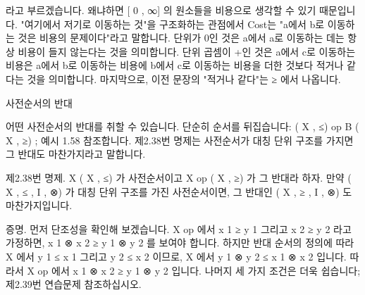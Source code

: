 \documentclass[11pt, a4paper, twoside, openany]{book}
\begin{document}
{\par\medskip
라고 부르겠습니다.  왜냐하면 [ 0 , ∞] 의 원소들을 비용으로 생각할 수 있기 때문입니다. "여기에서 저기로 이동하는 것"을 구조화하는 관점에서 Cost\hspace{0pt}는 "a\hspace{0pt}에서 b\hspace{0pt}로 이동하는 것은 비용의 문제이다"라고 말합니다. 단위가 0\hspace{0pt}인 것은 a\hspace{0pt}에서 a\hspace{0pt}로 이동하는 데는 항상 비용이 들지 않는다는 것을 의미합니다. 단위 곱셈이 +인 것은 a\hspace{0pt}에서 c\hspace{0pt}로 이동하는 비용은 a\hspace{0pt}에서 b\hspace{0pt}로 이동하는 비용에 b\hspace{0pt}에서 c\hspace{0pt}로 이동하는 비용을 더한 것보다 적거나 같다는 것을 의미합니다. 마지막으로, 이전 문장의 "적거나 같다"는 ≥ 에서 나옵니다.

\par\medskip
사전순서의 반대

\par\medskip
어떤 사전순서의 반대를 취할 수 있습니다. 단순히 순서를 뒤집습니다: ( X , ≤) op B ( X , ≥) ; 예시 1.58 참조합니다.  제\hspace{0pt}2.38\hspace{0pt}번 명제는 사전순서가 대칭 단위 구조를 가지면 그 반대도 마찬가지라고 말합니다.

\par\medskip
제\hspace{0pt}2.38\hspace{0pt}번 명제. X  ( X , ≤) 가 사전순서이고 X op  ( X , ≥) 가 그 반대라 하자. 만약 ( X , ≤ , I , ⊗) 가 대칭 단위 구조를 가진 사전순서이면, 그 반대인 ( X , ≥ , I , ⊗) 도 마찬가지입니다.

\par\medskip
증명. 먼저 단조성을 확인해 보겠습니다.  X op 에서 x 1 ≥ y 1 그리고 x 2 ≥ y 2 라고 가정하면, x 1 ⊗ x 2 ≥ y 1 ⊗ y 2 를 보여야 합니다. 하지만 반대 순서의 정의에 따라 X 에서 y 1 ≤ x 1 그리고 y 2 ≤ x 2 이므로, X 에서 y 1 ⊗ y 2 ≤ x 1 ⊗ x 2 입니다. 따라서 X op 에서 x 1 ⊗ x 2 ≥ y 1 ⊗ y 2 입니다. 나머지 세 가지 조건은 더욱 쉽습니다; 제\hspace{0pt}2.39\hspace{0pt}번 연습문제 참조하십시오.

}
\end{document}
